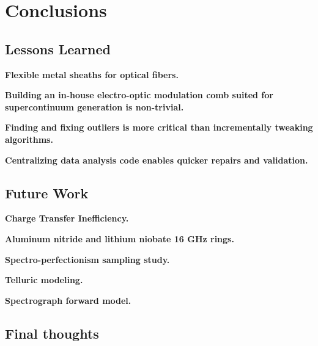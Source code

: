 \chapter{Conclusions}\label{chapter:conclusion}





\section{Lessons Learned}

\textbf{Flexible metal sheaths for optical fibers.}

\textbf{Building an in-house electro-optic modulation comb suited for supercontinuum generation is non-trivial.}

\textbf{Finding and fixing outliers is more critical than incrementally tweaking algorithms.}

\textbf{Centralizing data analysis code enables quicker repairs and validation.}




\section{Future Work}

\textbf{Charge Transfer Inefficiency.}

\textbf{Aluminum nitride and lithium niobate 16 GHz rings.}

\textbf{Spectro-perfectionism sampling study.}

\textbf{Telluric modeling.}

\textbf{Spectrograph forward model.}


\section{Final thoughts}